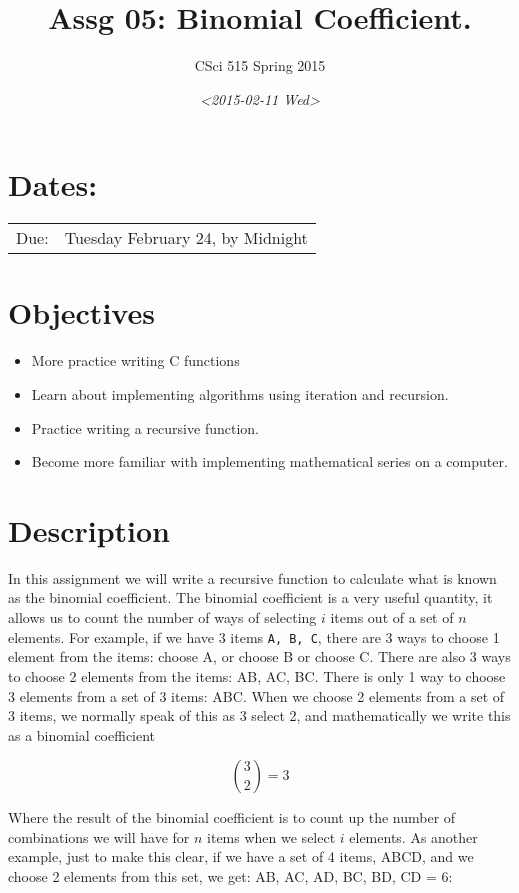 \documentclass[11pt]{article}
\author{CSci 515 Spring 2015}
\date{\textit{<2015-02-11 Wed>}}
\title{Assg 05: Binomial Coefficient.}
\begin{document}
\maketitle

\section*{Dates:}
\label{sec-1}
\begin{center}
\begin{tabular}{ll}
Due: & Tuesday February 24, by Midnight\\
\end{tabular}
\end{center}
\section*{Objectives}
\label{sec-2}
\begin{itemize}
\item More practice writing C functions
\item Learn about implementing algorithms using iteration and recursion.
\item Practice writing a recursive function.
\item Become more familiar with implementing mathematical series on a computer.
\end{itemize}
\section*{Description}
\label{sec-3}
In this assignment we will write a recursive function to calculate
what is known as the binomial coefficient.  The binomial coefficient
is a very useful quantity, it allows us to count the number of ways of
selecting $i$ items out of a set of $n$ elements.  For example, if we
have $3$ items \verb~A, B, C~, there are 3 ways to choose 1 element from
the items: choose A, or choose B or choose C.  There are also 3 ways
to choose 2 elements from the items: AB, AC, BC.  There is only 1 way
to choose 3 elements from a set of 3 items: ABC. When we choose
2 elements from a set of 3 items, we normally speak of this as
3 select 2, and mathematically we write this as a binomial coefficient

$$
{3 \choose 2} = 3
$$

Where the result of the binomial coefficient is to count up the number
of combinations we will have for $n$ items when we select $i$
elements.  As another example, just to make this clear, if we have a
set of 4 items, ABCD, and we choose 2 elements from this set, we get:
AB, AC, AD, BC, BD, CD = 6:
\end{document}
